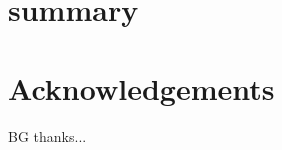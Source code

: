 \documentclass[a4paper,fleqn,usenatbib]{mnras}
\begin{document}
\section{summary}\label{sect_summary}



\section*{Acknowledgements}
BG thanks...






\bsp
\label{lastpage}
\end{document}
